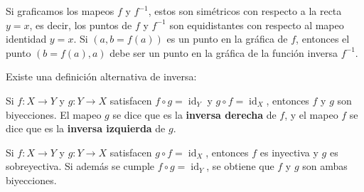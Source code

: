 \begin{observacion}
Si graficamos los mapeos $f$ y $f^{-1}$, estos son simétricos con respecto a
la recta $y=x$, es decir, los puntos de $f$ y $f^{-1}$ son equidistantes con
respecto al mapeo identidad $y=x$. Si $(a, b=f(a))$ es un punto en la gráfica
de $f$, entonces el punto $(b=f(a), a)$ debe ser un punto en la gráfica de la
función inversa $f^{-1}$.
\end{observacion}

\begin{center}
\end{center}

Existe una definición alternativa de inversa:

\begin{definicion}
Si $f : X \to Y$ y $g : Y \to X$ satisfacen $f \circ g = \operatorname{id}_Y$
y $g \circ f = \operatorname{id}_X$, entonces $f$ y $g$ son biyecciones. El
mapeo $g$ se dice que es la \textbf{inversa derecha} de $f$, y el mapeo $f$
se dice que es la \textbf{inversa izquierda} de $g$.
\end{definicion}

\begin{proposicionc}
Si $f : X \to Y$ y $g : Y \to X$ satisfacen $g \circ f = \operatorname{id}_X$,
entonces $f$ es inyectiva y $g$ es sobreyectiva. Si además se cumple
$f \circ g = \operatorname{id}_Y$, se obtiene que $f$ y $g$ son ambas
biyecciones.
\end{proposicionc}
